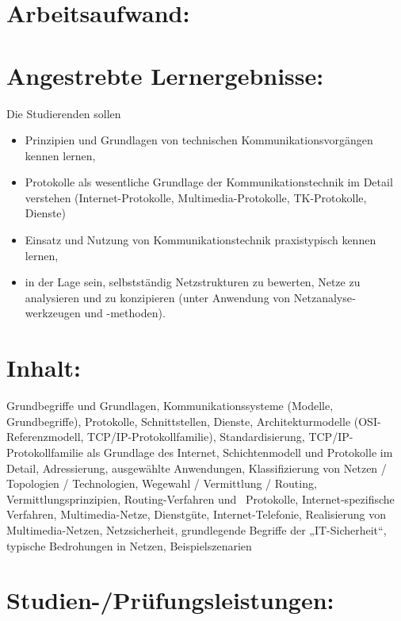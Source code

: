 \section{Arbeitsaufwand:}\label{arbeitsaufwand-12}

\section{Angestrebte
Lernergebnisse:}\label{angestrebte-lernergebnisse-12}

Die Studierenden sollen

\begin{itemize}
\item
  Prinzipien und Grundlagen von technischen Kommunikations­vor­gängen
  kennen lernen,
\item
  Protokolle als wesentliche Grundlage der Kommunikationstechnik im
  Detail verstehen (Internet-Protokolle, Multimedia-Protokolle,
  TK-Protokolle, Dienste)
\item
  Einsatz und Nutzung von Kommunikations­tech­nik praxistypisch kennen
  lernen,
\item
  in der Lage sein, selbstständig Netzstrukturen zu bewerten, Netze zu
  analysieren und zu konzipieren (unter Anwendung von
  Netz­analyse­werkzeugen und -methoden).
\end{itemize}

\section{Inhalt:}\label{inhalt-12}

Grundbegriffe und Grundlagen, Kommunikationssysteme (Modelle,
Grundbegriffe), Protokolle, Schnittstellen, Dienste, Architekturmodelle
(OSI-Referenzmodell, TCP/IP-Protokollfamilie), Standardisierung,
TCP/IP-Protokollfamilie als Grundlage des Internet, Schichtenmodell und
Protokolle im Detail, Adressierung, ausgewählte Anwendungen,
Klassifizierung von Netzen / Topologien / Technologien, Wegewahl /
Vermittlung / Routing, Vermittlungsprinzipien, Routing-Verfahren und~
Protokolle, Internet-spezifische Verfahren, Multimedia-Netze,
Dienstgüte, Internet-Telefonie, Realisierung von Multimedia-Netzen,
Netzsicherheit, grundlegende Begriffe der „IT-Sicherheit``, typische
Bedrohungen in Netzen, Beispielszenarien

\section{Studien-/Prüfungsleistungen:}\label{studien-pruxfcfungsleistungen-12}

